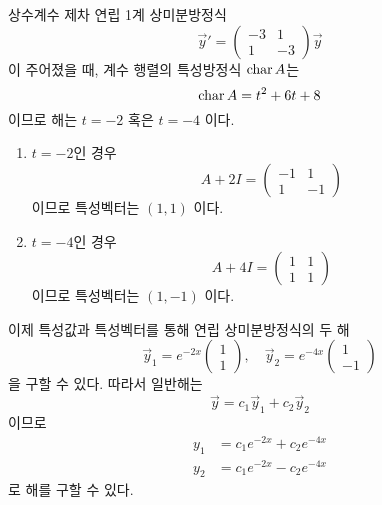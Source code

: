 \documentclass[../engineering_mathematics_lecture_note.tex]{subfiles}
\begin{document}
\begin{example}
    상수계수 제차 연립 1계 상미분방정식
    \begin{equation*}
        \vec y' = \begin{pmatrix}
            -3 & 1 \\
            1 & -3
        \end{pmatrix}
        \vec y
    \end{equation*}
    이 주어졌을 때, 계수 행렬의 특성방정식 $\operatorname{char} A$는
    \begin{equation*}
        \operatorname{char} A = t^2 + 6t + 8
    \end{equation*}
    이므로 해는 $t = -2$ 혹은 $t = -4$ 이다.
    \begin{enumerate}
        \item $t = -2$인 경우
            \begin{equation*}
                A + 2I = \begin{pmatrix}
                    -1 & 1\\
                    1 & -1
                \end{pmatrix}
            \end{equation*}
            이므로 특성벡터는 $(1, 1)$ 이다.
        \item $t = -4$인 경우
            \begin{equation*}
                A + 4I = \begin{pmatrix}
                    1 & 1\\
                    1 & 1
                \end{pmatrix}
            \end{equation*}
            이므로 특성벡터는 $(1, -1)$ 이다.
    \end{enumerate}
    이제 특성값과 특성벡터를 통해 연립 상미분방정식의 두 해
    \begin{equation*}
        \vec y_1 = e^{-2x} \begin{pmatrix}
            1 \\ 1
        \end{pmatrix}, \quad \vec y_2 = e^{-4x} \begin{pmatrix}
            1 \\ -1
        \end{pmatrix}
    \end{equation*}
    을 구할 수 있다.
    따라서 일반해는
    \begin{equation*}
        \vec y = c_1 \vec y_1 + c_2 \vec y_2
    \end{equation*}
    이므로
    \begin{align*}
        y_1 &= c_1 e^{-2x} + c_2 e^{-4x}\\
        y_2 &= c_1 e^{-2x} - c_2 e^{-4x}
    \end{align*}
    로 해를 구할 수 있다.


\end{example}
\end{document}

